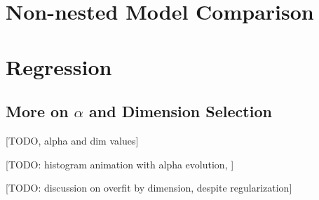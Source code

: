 \section{Non-nested Model Comparison}
\label{appsubsec:nonnestedcompres}

\section{Regression}
\subsection{More on \(\alpha\) and Dimension Selection}
\label{appsubsec:alphadim}
[TODO, alpha and dim values]

[TODO: histogram animation with alpha evolution, ]

[TODO: discussion on overfit by dimension, despite regularization]